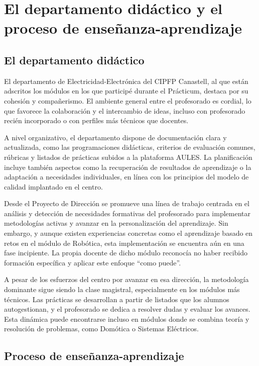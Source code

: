 \chapter{El departamento didáctico y el proceso de enseñanza-aprendizaje}

\section{El departamento didáctico}
El departamento de Electricidad-Electrónica del CIPFP Canastell, al que están adscritos los módulos en los que participé durante el Prácticum, destaca por su cohesión y compañerismo. El ambiente general entre el profesorado es cordial, lo que favorece la colaboración y el intercambio de ideas, incluso con profesorado recién incorporado o con perfiles más técnicos que docentes.

A nivel organizativo, el departamento dispone de documentación clara y actualizada, como las programaciones didácticas, criterios de evaluación comunes, rúbricas y listados de prácticas subidos a la plataforma AULES. La planificación incluye también aspectos como la recuperación de resultados de aprendizaje o la adaptación a necesidades individuales, en línea con los principios del modelo de calidad implantado en el centro.

Desde el Proyecto de Dirección \cite{proyectoDireccion2022} se promueve una línea de trabajo centrada en el análisis y detección de necesidades formativas del profesorado para implementar metodologías activas y avanzar en la personalización del aprendizaje. Sin embargo, y aunque existen experiencias concretas como el aprendizaje basado en retos en el módulo de Robótica, esta implementación se encuentra aún en una fase incipiente. La propia docente de dicho módulo reconocía no haber recibido formación específica y aplicar este enfoque “como puede”.

A pesar de los esfuerzos del centro por avanzar en esa dirección, la metodología dominante sigue siendo la clase magistral, especialmente en los módulos más técnicos. Las prácticas se desarrollan a partir de listados que los alumnos autogestionan, y el profesorado se dedica a resolver dudas y evaluar los avances. Esta dinámica puede encontrarse incluso en módulos donde se combina teoría y resolución de problemas, como Domótica o Sistemas Eléctricos.


\section{Proceso de enseñanza-aprendizaje}

